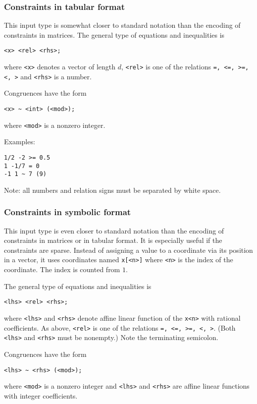 \documentclass[12pt,a4paper]{scrartcl}
\theoremstyle{definition}
\begin{document}
\subsubsection{Constraints in tabular format}\label{const_syntax}

This input type is somewhat closer to standard notation than the encoding of constraints in matrices. The general type of equations and inequalities is
\begin{Verbatim}
<x> <rel> <rhs>;
\end{Verbatim}
where \verb|<x>| denotes a vector of length $d$, \verb|<rel>| is one of the relations \verb|=, <=, >=, <, >| and \verb|<rhs>| is a number.

Congruences have the form
\begin{Verbatim}
<x> ~ <int> (<mod>);
\end{Verbatim}
where \verb|<mod>| is a nonzero integer.

Examples:
\begin{Verbatim}
1/2 -2 >= 0.5
1 -1/7 = 0
-1 1 ~ 7 (9)
\end{Verbatim}

Note: all numbers and relation signs must be separated by white space.

\subsubsection{Constraints in symbolic format}\label{symb_syntax}

This input type is even closer to standard notation than the encoding of constraints in matrices or in tabular format. It is especially useful if the constraints are sparse. Instead of assigning a value to a coordinate via its position in a vector, it uses coordinates named \verb|x[<n>]| where \verb|<n>| is the index of the coordinate. The index is counted from $1$. 

 The general type of equations and inequalities is
\begin{Verbatim}
<lhs> <rel> <rhs>;
\end{Verbatim}
where \verb|<lhs>| and \verb|<rhs>| denote affine linear function of the \verb|x<n>| with rational coefficients. 
As above, \verb|<rel>| is one of the relations \verb|=, <=, >=, <, >|. (Both \verb|<lhs>| and \verb|<rhs>| must be nonempty.) Note the terminating semicolon.

Congruences have the form
\begin{Verbatim}
<lhs> ~ <rhs> (<mod>);
\end{Verbatim}
where \verb|<mod>| is a nonzero integer and \verb|<lhs>| and \verb|<rhs>| are affine linear functions with integer coefficients.
\end{document}
